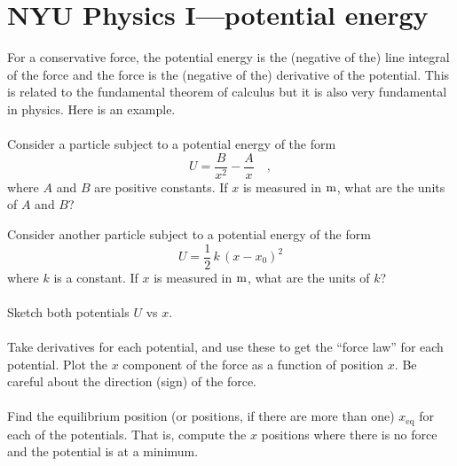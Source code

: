 \documentclass[12pt]{article}
\begin{document}
\section*{NYU Physics I---potential energy}

For a conservative force, the potential energy is the (negative of
the) line integral of the force and the force is the (negative of the)
derivative of the potential.  This is related to the fundamental
theorem of calculus but it is also very fundamental in physics.  Here
is an example.

\paragraph{\theproblem}%
Consider a particle subject to a potential energy of the form
\begin{equation}
U = \frac{B}{x^2} - \frac{A}{x} \quad ,
\label{eq:hard}
\end{equation}
where $A$ and $B$ are positive constants.  If $x$ is measured in $\mathrm{m}$,
what are the units of $A$ and $B$?

Consider another particle subject to a potential energy of the form
\begin{equation}
U = \frac{1}{2}\,k\,(x-x_0)^2
\label{eq:easy}
\end{equation}
where $k$ is a constant.  If $x$ is measured in $\mathrm{m}$, what are
the units of $k$?

\paragraph{\theproblem}%
Sketch both potentials $U$ vs $x$.

\paragraph{\theproblem}%
Take derivatives for each potential, and use these to get the ``force
law'' for each potential. Plot the $x$ component of the force as a
function of position $x$. Be careful about the direction (sign) of the
force.

\paragraph{\theproblem}%
Find the equilibrium position (or positions, if there are more than
one) $x_\mathrm{eq}$ for each of the potentials.  That is, compute the
$x$ positions where there is no force and the potential is at a
minimum.
\end{document}
